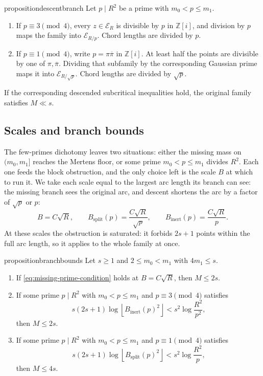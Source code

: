 \documentclass[11pt]{article}
\newcommand{\GI}{\mathbb Z[i]}
\newcommand{\floor}[1]{\left\lfloor #1 \right\rfloor}
\newcommand{\conj}[1]{\overline{#1}}
\newcommand{\E}{\mathcal E}
\begin{document}
\begin{restatable}{proposition}{descentbranch}\label{prop:descent}
Let \(p\mid R^2\) be a prime with \(m_0<p\le m_1\).
\begin{enumerate}[label=(\alph*)]
\item If \(p\equiv 3\pmod 4\), every \(z\in\E_R\) is divisible by \(p\) in \(\GI\), and division by \(p\) maps the family into \(\E_{R/p}\).
Chord lengths are divided by \(p\).
\item If \(p\equiv 1\pmod 4\), write \(p=\pi\conj\pi\) in \(\GI\).
At least half the points are divisible by one of \(\pi,\conj\pi\).
Dividing that subfamily by the corresponding Gaussian prime maps it into \(\E_{R/\sqrt p}\).
Chord lengths are divided by \(\sqrt p\).
\end{enumerate}
If the corresponding descended subcritical inequalities hold, the original family satisfies \(M\ll s\).
\end{restatable}

\subsection{Scales and branch bounds}
\label{subsec:scales}

The few-primes dichotomy leaves two situations: either the missing mass on \((m_0,m_1]\) reaches the Mertens floor, or some prime \(m_0<p\le m_1\) divides \(R^2\).
Each one feeds the block obstruction, and the only choice left is the scale \(B\) at which to run it.
We take each scale equal to the largest arc length its branch can see: the missing branch sees the original arc, and descent shortens the arc by a factor of \(\sqrt p\) or \(p\):
\[
  B=C\sqrt R,
  \qquad
  B_{\mathrm{split}}(p)=\frac{C\sqrt R}{\sqrt p},
  \qquad
  B_{\mathrm{inert}}(p)=\frac{C\sqrt R}{p}.
\]
At these scales the obstruction is saturated: it forbids \(2s+1\) points within the full arc length, so it applies to the whole family at once.

\begin{restatable}{proposition}{branchbounds}\label{prop:branches}
Let \(s\ge1\) and \(2\le m_0<m_1\) with \(4m_1\le s\).
\begin{enumerate}[label=(\alph*)]
\item If \eqref{eq:missing-prime-condition} holds at \(B=C\sqrt R\), then \(M\le 2s\).
\item If some prime \(p\mid R^2\) with \(m_0<p\le m_1\) and \(p\equiv3\pmod4\) satisfies
\[
  s(2s+1)\log\floor{B_{\mathrm{inert}}(p)^2}<s^2\log\frac{R^2}{p^2},
\]
then \(M\le 2s\).
\item If some prime \(p\mid R^2\) with \(m_0<p\le m_1\) and \(p\equiv1\pmod4\) satisfies
\[
  s(2s+1)\log\floor{B_{\mathrm{split}}(p)^2}<s^2\log\frac{R^2}{p},
\]
then \(M\le 4s\).
\end{enumerate}
\end{restatable}
\end{document}
